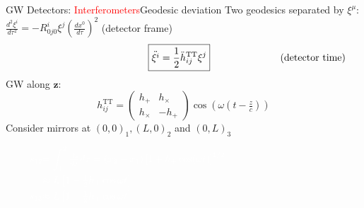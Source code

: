\documentclass[xcolor=dvipsnames,t]{beamer}
\newcommand{\todo}[1]{\textcolor{orange}{\texttt{TODO: #1}}}
\newcommand{\red}[1]{\textcolor{red}{#1}}
\newcommand{\w}[1]{\textcolor{white}{#1}}
\begin{document}
 \begin{frame}{GW Detectors: \red{Interferometers}}{Geodesic deviation}
    Two geodesics separated by $\xi^\mu$:
    $ \tfrac{d^2 \xi^i}{d\tau^2} = -R^i_{0j0} \xi^j\left(\tfrac{dx^0}{d\tau}\right)^2$ \hfill (detector frame)\\
    \vspace{-3mm}
    \[
    \hspace{4.5cm} \boxed{\ddot{\xi^i} = \frac{1}{2} \ddot{h}_{ij}^\text{TT} \xi^j} \hspace{2.5cm} \text{(detector time)}
    \]
    GW along $\mathbf{z}$: 
      \[
      h_{ij}^\text{TT} = \left(\begin{array}{cc}
				h_+ & h_\times \\
				h_\times & - h_+
				\end{array}\right) \cos\left(\omega\left( t-\tfrac{z}{c}\right)\right)
      \]
      Consider mirrors at $(0,0)_1, (L,0)_2$ and $(0,L)_3$
          \begin{small}
      \begin{align*}
	\w{s_{12} }& \w{=\int_1^2 \tfrac{ds}{dx}dx = (x_2-x_1) \left[ 1 + h_+ \cos(\omega t)\right]^{1/2}\hspace{4cm} }\\
	   &\w{ \approx L \left[ 1+\tfrac{1}{2} h_+ \cos\omega t \right] }\\
      \w{s_{13}} &\w{\approx L \left[ 1-\tfrac{1}{2} h_+ \cos\omega t \right]}
      \end{align*}
      \end{small}
 \end{frame}
 
\end{document}
